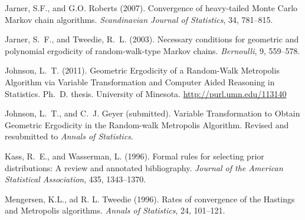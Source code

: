 \documentclass{article}
\begin{document}
\begin{thebibliography}{}

Jarner, S.F., and G.O. Roberts (2007).
\newblock Convergence of heavy-tailed Monte Carlo Markov chain algorithms.
\newblock \emph{Scandinavian Journal of Statistics}, 34, 781--815.

Jarner, S.~F., and Tweedie, R.~L. (2003).
\newblock Necessary conditions for geometric and polynomial ergodicity of
    random-walk-type Markov chains.
\newblock \emph{Bernoulli}, 9, 559--578.

Johnson, L.~T. (2011).
\newblock Geometric Ergodicity of a Random-Walk Metropolis Algorithm via
  Variable Transformation and Computer Aided Reasoning in Statistics.
\newblock Ph.~D. thesis.  University of Minesota.
  \url{http://purl.umn.edu/113140}

Johnson, L.~T., and C.~J. Geyer (submitted).
\newblock Variable Transformation to Obtain Geometric Ergodicity
    in the Random-walk Metropolis Algorithm.
\newblock Revised and resubmitted to \emph{Annals of Statistics}.

Kass, R.~E., and Wasserman, L. (1996).
\newblock Formal rules for selecting prior distributions: A review and
    annotated bibliography.
\newblock \emph{Journal of the American Statistical Association},
    435, 1343--1370.

  Mengersen, K.L., ad R. L. Tweedie (1996).
\newblock Rates of convergence of the Hastings and Metropolis algorithms.
\newblock \emph{Annals of Statistics}, 24, 101--121.

\end{thebibliography}
\end{document}
